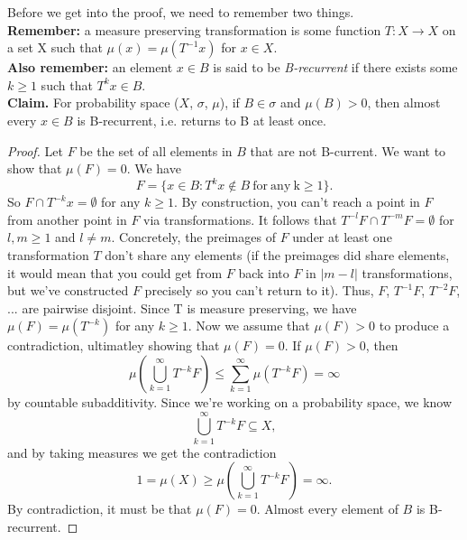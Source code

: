 \documentclass{article}
\begin{document}
Before we get into the proof, we need to remember two things. \\
\textbf{Remember:} a measure preserving transformation is some function $T : X \rightarrow X$ on a set X such that
$\mu(x) = \mu(T^{-1}x)$ for $x \in X$.
\\
\textbf{Also remember:} an element $x \in B$ is said to be \textit{B-recurrent} if there exists some $k \geq 1$
such that $T^{k}x \in B$. 
\\
\textbf{Claim.} For probability space ($X$, $\sigma$, $\mu$), if $B \in \sigma$ and $\mu(B) > 0$, then almost every $x \in B$ is B-recurrent, i.e. returns to B at least once. 
\begin{proof}
Let $F$ be the set of all elements in $B$ that are not B-current.
We want to show that $\mu(F) = 0$. We have $$ F = \{x \in B : T^{k}x \not\in B\ \mathrm{for\ any\ k \geq 1\}}.$$ 
So $F \cap T^{-k}x = \emptyset$ for any $k \geq 1$. By construction, you can't reach a point in $F$ from another point in $F$ via transformations. 
It follows that $T^{-l}F \cap T^{-m}F = \emptyset$ for $l, m \geq 1$ and $l \neq m$. Concretely, the preimages of $F$ under at least one transformation $T$ 
don't share any elements (if the preimages did share elements, it would mean that you could get from $F$ back into $F$ in $|m - l|$ transformations, but
we've constructed $F$ precisely so you can't return to it). 
Thus, $F$, $T^{-1}F$, $T^{-2}F$, $...$ are pairwise disjoint. Since T is measure preserving, we have $\mu(F) = \mu(T^{-k})$ for any $k \geq 1$. 
Now we assume that $\mu(F) > 0$ to produce a contradiction, ultimatley showing that $\mu(F) = 0$. 
If $\mu(F) > 0$, then $$\mu(\bigcup\limits_{k=1}^{\infty} T^{-k}F) \leq \sum\limits_{k = 1}^{\infty} \mu(T^{-k}F) = \infty$$ by countable subadditivity.
Since we're working on a probability space, we know $$\bigcup\limits_{k=1}^{\infty}T^{-k}F \subseteq X,$$ and by taking measures we get the contradiction
$$1 = \mu(X) \geq \mu(\bigcup\limits_{k=1}^{\infty}T^{-k}F) = \infty.$$ By contradiction, it must be that $\mu(F) = 0$. 
Almost every element of $B$ is B-recurrent. 

\end{proof}
\end{document}
